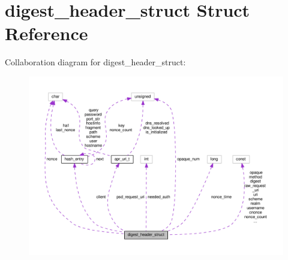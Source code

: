 \hypertarget{structdigest__header__struct}{}\section{digest\+\_\+header\+\_\+struct Struct Reference}
\label{structdigest__header__struct}


Collaboration diagram for digest\+\_\+header\+\_\+struct\+:
\nopagebreak
\begin{figure}[H]
\begin{center}
\leavevmode
\includegraphics[width=350pt]{structdigest__header__struct__coll__graph}
\end{center}
\end{figure}
